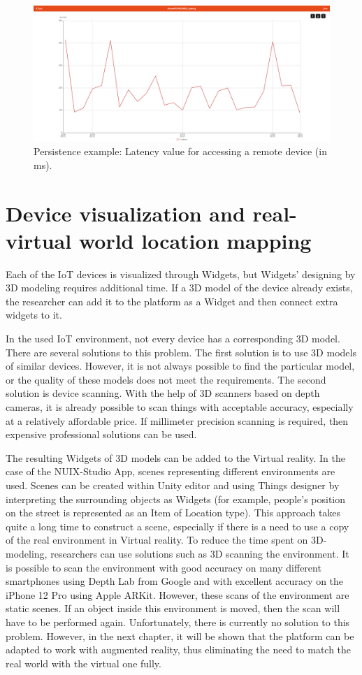 \begin{figure}
  \centering
  \includegraphics[width=0.9\linewidth]{figures/PersistenceExample.png}
  \caption{Persistence example: Latency value for accessing a remote device (in ms). }
  \label{fig:PersistenceExample-figure}
\end{figure}

\section{Device visualization and real-virtual world location mapping}

Each of the IoT devices is visualized through Widgets, but Widgets' designing by 3D modeling requires additional time. If a 3D model of the device already exists, the researcher can add it to the platform as a Widget and then connect extra widgets to it.

In the used IoT environment, not every device has a corresponding 3D model. There are several solutions to this problem. The first solution is to use 3D models of similar devices. However, it is not always possible to find the particular model, or the quality of these models does not meet the requirements. The second solution is device scanning. With the help of 3D scanners based on depth cameras, it is already possible to scan things with acceptable accuracy, especially at a relatively affordable price. If millimeter precision scanning is required, then expensive professional solutions can be used.

The resulting Widgets of 3D models can be added to the Virtual reality. In the case of the NUIX-Studio App, scenes representing different environments are used. Scenes can be created within Unity editor and using Things designer by interpreting the surrounding objects as Widgets (for example, people's position on the street is represented as an Item of Location type). This approach takes quite a long time to construct a scene, especially if there is a need to use a copy of the real environment in Virtual reality. To reduce the time spent on 3D-modeling, researchers can use solutions such as 3D scanning the environment. It is possible to scan the environment with good accuracy on many different smartphones using Depth Lab from Google and with excellent accuracy on the iPhone 12 Pro using Apple ARKit. However, these scans of the environment are static scenes. If an object inside this environment is moved, then the scan will have to be performed again. Unfortunately, there is currently no solution to this problem. However, in the next chapter, it will be shown that the platform can be adapted to work with augmented reality, thus eliminating the need to match the real world with the virtual one fully.


